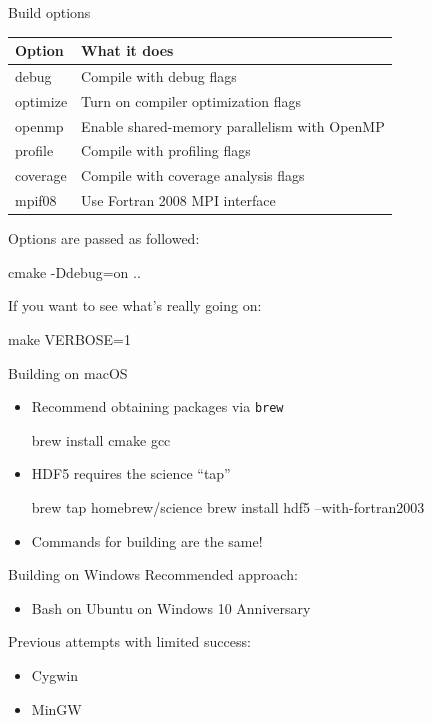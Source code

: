 \documentclass[noamssymb,svgnames]{beamer}
\begin{document}
\begin{frame}[fragile]{Build options}
  \begin{table}
    \centering
    \footnotesize{
    \begin{tabular}{ll}
      \toprule
      \textbf{Option} & \textbf{What it does} \\
      \midrule
      debug & Compile with debug flags \\
      optimize & Turn on compiler optimization flags \\
      openmp & Enable shared-memory parallelism with OpenMP \\
      profile & Compile with profiling flags \\
      coverage & Compile with coverage analysis flags \\
      mpif08 & Use Fortran 2008 MPI interface \\
      \bottomrule
    \end{tabular}
    }
  \end{table}
  \vfill
  Options are passed as followed:
  \begin{shell}
    cmake -Ddebug=on ..
  \end{shell}
  \vfill
  If you want to see what's really going on:
  \begin{shell}
    make VERBOSE=1
  \end{shell}
\end{frame}

\begin{frame}[fragile]{Building on macOS}
  \begin{itemize}
  \item Recommend obtaining packages via \texttt{brew}
    \begin{shell}
      brew install cmake gcc
    \end{shell}
  \item HDF5 requires the science ``tap''
    \begin{shell}
      brew tap homebrew/science
      brew install hdf5 --with-fortran2003
    \end{shell}
  \item Commands for building are the same!
  \end{itemize}
\end{frame}

\begin{frame}{Building on Windows}
  Recommended approach:
  \begin{itemize}
  \item Bash on Ubuntu on Windows 10 Anniversary
  \end{itemize}
  Previous attempts with limited success:
  \begin{itemize}
  \item Cygwin
  \item MinGW
  \end{itemize}
\end{frame}
\end{document}
